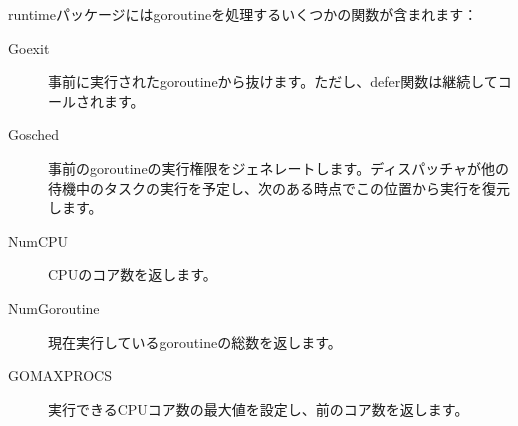 runtimeパッケージにはgoroutineを処理するいくつかの関数が含まれます：

\begin{description}
  \item[Goexit] 事前に実行されたgoroutineから抜けます。ただし、defer関数は継続してコールされます。
  \item[Gosched] 事前のgoroutineの実行権限をジェネレートします。ディスパッチャが他の待機中のタスクの実行を予定し、次のある時点でこの位置から実行を復元します。
  \item[NumCPU] CPUのコア数を返します。
  \item[NumGoroutine] 現在実行しているgoroutineの総数を返します。
  \item[GOMAXPROCS] 実行できるCPUコア数の最大値を設定し、前のコア数を返します。
\end{description}
